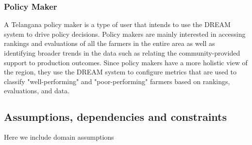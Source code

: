 \begin{flushleft}
\subsubsection{Policy Maker}
A Telangana policy maker is a type of user that intends to use the DREAM system to drive policy decisions. Policy makers are mainly interested in accessing rankings and evaluations of all the farmers in the entire area as well as identifying broader trends in the data such as relating the community-provided support to production outcomes. Since policy makers have a more holistic view of the region, they use the DREAM system to configure metrics that are used to classify "well-performing" and "poor-performing" farmers based on rankings, evaluations, and data.\\
%



\end{flushleft}


\subsection{Assumptions, dependencies and constraints}
Here we include domain assumptions




